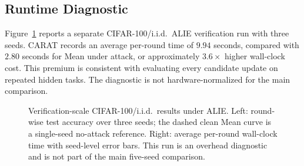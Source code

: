 \FloatBarrier
\subsection{Runtime Diagnostic}
\label{sec:appendix-runtime}

Figure~\ref{fig:verification-curves} reports a separate CIFAR-100/i.i.d.\ ALIE verification run with three seeds. CARAT records an average per-round time of $9.94$ seconds, compared with $2.80$ seconds for Mean under attack, or approximately $3.6\times$ higher wall-clock cost. This premium is consistent with evaluating every candidate update on repeated hidden tasks. The diagnostic is not hardware-normalized for the main comparison.

\begin{figure}[htbp]
  \centering
  \caption{Verification-scale CIFAR-100/i.i.d.\ results under ALIE. Left: round-wise test accuracy over three seeds; the dashed clean Mean curve is a single-seed no-attack reference. Right: average per-round wall-clock time with seed-level error bars. This run is an overhead diagnostic and is not part of the main five-seed comparison.}
  \label{fig:verification-curves}
\end{figure}
\FloatBarrier
